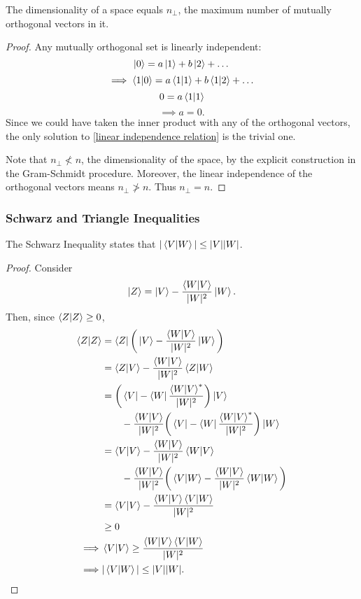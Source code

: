 \begin{theorem}\label{n_perp dim}
The dimensionality of a space equals $n_\perp$, the maximum number of mutually orthogonal vectors in it.
\end{theorem}

\begin{proof}
Any mutually orthogonal set is linearly independent:
    $$\ket{0} = a\ket{1} + b\ket{2} + \dots$$
    $$\implies \braket{1}{0} = a\braket{1}{1} + b\braket{1}{2} + \dots$$
    $$0 = a\braket{1}{1}$$
    $$\implies a = 0.$$
Since we could have taken the inner product with any of the orthogonal vectors, the only solution to \eqref{linear independence relation} is the trivial one.

Note that $n_\perp \nless n$, the dimensionality of the space, by the explicit construction in the Gram-Schmidt procedure. Moreover, the linear independence of the orthogonal vectors means $n_\perp \ngtr n$. Thus $n_\perp = n$.
\end{proof}

\subsubsection{Schwarz and Triangle Inequalities}

\begin{theorem}\label{schwarz inequality}
The Schwarz Inequality states that $|\braket{V}{W}| \leq |V||W|$.
\end{theorem}

\begin{proof}
Consider
\begin{equation*}
    \ket{Z} = \ket{V} - \frac{\braket{W}{V}}{|W|^2}\ket{W}.
\end{equation*}
Then, since $\braket{Z}{Z} \geq 0$,
\begin{align*}
    \braket{Z}{Z} &= \bra{Z} \bigg{(}\ket{V} - \frac{\braket{W}{V}}{|W|^2}\ket{W}\bigg{)} \\
    &= \braket{Z}{V} - \frac{\braket{W}{V}}{|W|^2} \braket{Z}{W} \\
    &= \bigg{(}\bra{V} - \bra{W}\frac{\braket{W}{V}^*}{|W|^2}\bigg{)}\ket{V}  \\
    &\qquad - \frac{\braket{W}{V}}{|W|^2} \bigg{(}\bra{V} - \bra{W}\frac{\braket{W}{V}^*}{|W|^2}\bigg{)} \ket{W} \\
    &= \braket{V}{V} - \frac{\braket{W}{V}}{|W|^2} \braket{W}{V} \\
    &\qquad - \frac{\braket{W}{V}}{|W|^2}\bigg{(}\braket{V}{W} - \frac{\braket{W}{V}}{|W|^2}\braket{W}{W}\bigg{)} \\
    &= \braket{V}{V} - \frac{\braket{W}{V} \braket{V}{W}}{|W|^2} \\
    &\geq 0 \\
    \implies &\braket{V}{V} \geq \frac{\braket{W}{V} \braket{V}{W}}{|W|^2} \\
    \implies &|\braket{V}{W}| \leq |V||W|.
\end{align*}
\end{proof}

